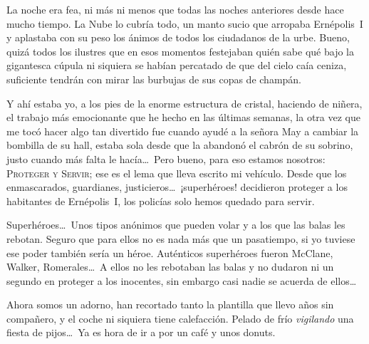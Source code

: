 La noche era fea, ni más ni menos que todas las noches anteriores desde hace mucho tiempo. La Nube lo cubría todo, un manto sucio que arropaba Ernépolis~I y aplastaba con su peso los ánimos de todos los ciudadanos de la urbe. Bueno, quizá todos los ilustres que en esos momentos festejaban quién sabe qué bajo la gigantesca cúpula ni siquiera se habían percatado de que del cielo caía ceniza, suficiente tendrán con mirar las burbujas de sus copas de champán.

Y ahí estaba yo, a los pies de la enorme estructura de cristal, haciendo de niñera, el trabajo más emocionante que he hecho en las últimas semanas, la otra vez que me tocó hacer algo tan divertido fue cuando ayudé a la señora May a cambiar la bombilla de su hall, estaba sola desde que la abandonó el cabrón de su sobrino, justo cuando más falta le hacía\dots\ Pero bueno, para eso estamos nosotros: \textsc{Proteger y Servir}; ese es el lema que lleva escrito mi vehículo. Desde que los enmascarados, guardianes, justicieros\dots\ ¡superhéroes! decidieron proteger a los habitantes de Ernépolis~I, los policías solo hemos quedado para servir. 

Superhéroes\dots\ Unos tipos anónimos que pueden volar y a los que las balas les rebotan. Seguro que para ellos no es nada más que un pasatiempo, si yo tuviese ese poder también sería un héroe. Auténticos superhéroes fueron McClane, Walker, Romerales\dots\ A ellos no les rebotaban las balas y no dudaron ni un segundo en proteger a los inocentes, sin embargo casi nadie se acuerda de ellos\dots

Ahora somos un adorno, han recortado tanto la plantilla que llevo años sin compañero, y el coche ni siquiera tiene calefacción. Pelado de frío \emph{vigilando} una fiesta de pijos\dots\ Ya es hora de ir a por un café y unos donuts. 
